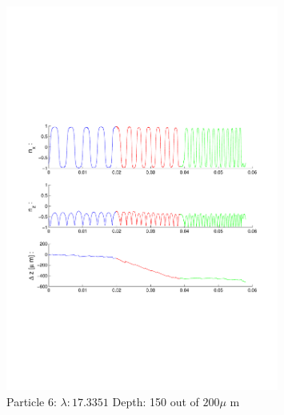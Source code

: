 \begin{figure}[H]
\includegraphics[width=0.8\textwidth]{Images/Particle 6/Particle6.pdf}
\caption{Particle 6:  $ \lambda: 17.3351$ Depth: 150 out of $200 \mu $ m}
\centering

\end{figure}

